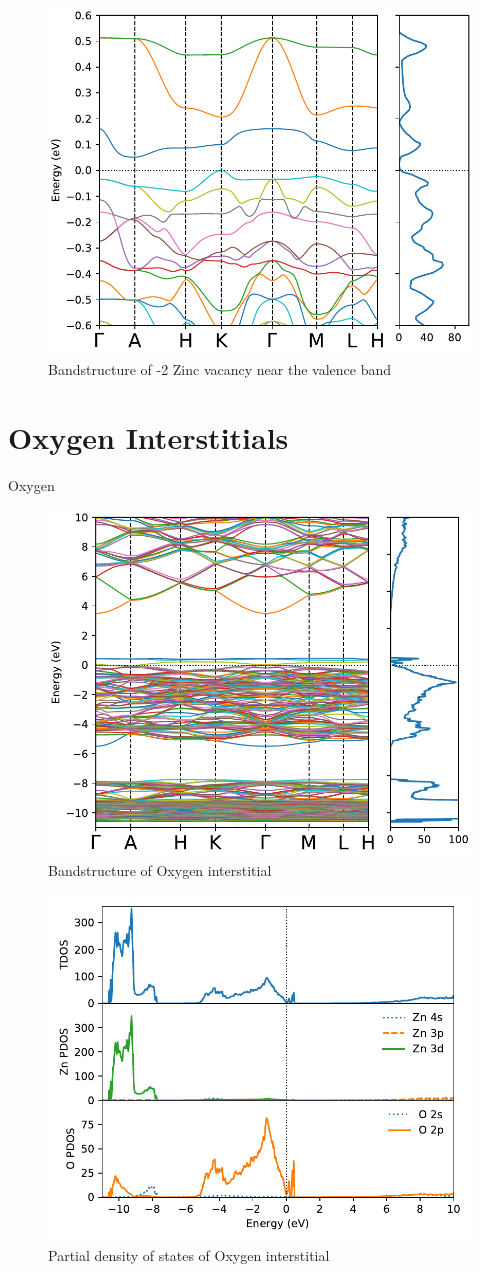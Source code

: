 \begin{figure}[tbh!]
	\centering
	\includegraphics[width=0.6\linewidth]{"images/rnd/band-dos-close_Zn_vac-n2"}
	\caption[Bandstructure of -2 Zinc vacancy near the valence band]{Bandstructure of -2 Zinc vacancy near the valence band}
	\label{fig:band-dos-close_Zn_vac-n2}
\end{figure}

\clearpage

\section{Oxygen Interstitials}
Oxygen 
\begin{figure}[tbh!]
	\centering
	\includegraphics[width=0.6\linewidth]{"images/rnd/band-dos_O_i"}
	\caption[Bandstructure of Oxygen interstitial]{Bandstructure of Oxygen interstitial}
\end{figure}

\begin{figure}[tbh!]
	\centering
	\includegraphics[width=0.6\linewidth]{"images/rnd/dos-pdos_O_i"}
	\caption[Partial density of states of Oxygen interstitial]{Partial density of states of Oxygen interstitial}
\end{figure}

